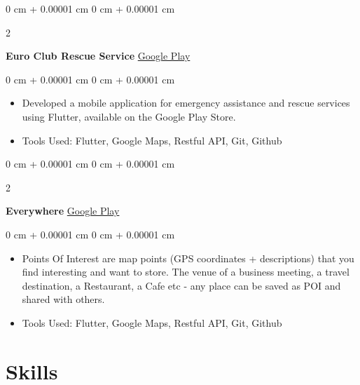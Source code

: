 \documentclass[10pt, letterpaper]{article}
\newenvironment{highlights}{
    \begin{itemize}[
        topsep=0.10 cm,
        parsep=0.10 cm,
        partopsep=0pt,
        itemsep=0pt,
        leftmargin=0 cm + 10pt
    ]
}{
    \end{itemize}
} %
\newenvironment{onecolentry}{
    \begin{adjustwidth}{
        0 cm + 0.00001 cm
    }{
        0 cm + 0.00001 cm
    }
}{
    \end{adjustwidth}
} %
\newenvironment{twocolentry}[2][]{
    \onecolentry
    \def\secondColumn{#2}
    \setcolumnwidth{\fill, 4.5 cm}
    \begin{paracol}{2}
}{
    \switchcolumn \raggedleft \secondColumn
    \end{paracol}
    \endonecolentry
} %
\begin{document}
        \vspace{0.2 cm}

        \begin{twocolentry}{
            \href{https://play.google.com/store/apps/details?id=com.euroclub.rescue}{Google Play}
        }
            \textbf{Euro Club Rescue Service
}\end{twocolentry}

        \vspace{0.10 cm}
        \begin{onecolentry}
            \begin{highlights}
                \item Developed a mobile application for emergency assistance and rescue services using Flutter, available on the Google Play Store.
                \item Tools Used: Flutter, Google Maps, Restful API, Git, Github
            \end{highlights}
        \end{onecolentry}


        \vspace{0.2 cm}

        \begin{twocolentry}{
            \href{https://play.google.com/store/apps/details?id=com.everywhere.eg}{Google Play}
        }
            \textbf{Everywhere}\end{twocolentry}

        \vspace{0.10 cm}
        \begin{onecolentry}
            \begin{highlights}
                \item Points Of Interest are map points (GPS coordinates + descriptions) that you find interesting and want to store. The venue of a business meeting, a travel destination, a Restaurant, a Cafe etc - any place can be saved as POI and shared with others.
                \item Tools Used: Flutter, Google Maps, Restful API, Git, Github
            \end{highlights}
        \end{onecolentry}



    
  

    
    \section{Skills}
\end{document}
